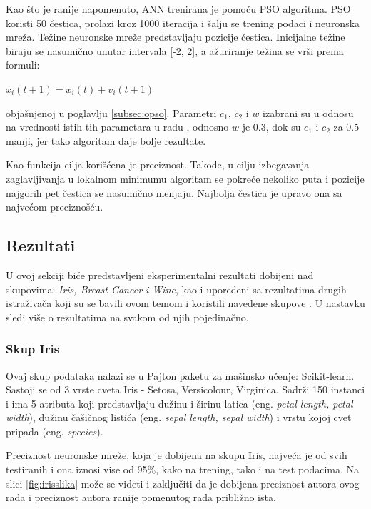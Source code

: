 \documentclass[a4paper]{article}
\begin{document}
{Kao što je ranije napomenuto, ANN trenirana je pomoću PSO algoritma. PSO koristi 50 čestica, prolazi kroz 1000 iteracija i šalju se trening podaci i neuronska mreža. Težine neuronske mreže predstavljaju pozicije čestica. Inicijalne težine biraju se nasumično unutar intervala [-2, 2], a ažuriranje težina se vrši prema formuli: 
\begin{center}
{$x_i(t+1) = x_i(t) + v_i(t+1)$}
\end{center}
objašnjenoj u poglavlju \ref{subsec:opso}. Parametri $c_1$, $c_2$ i $w$ izabrani su u odnosu na vrednosti istih tih parametara u radu \cite{hindawi},
odnosno $w$ je 0.3, dok su $c_1$ i $c_2$ za 0.5 manji, jer tako algoritam daje bolje rezultate. 

Kao funkcija cilja korišćena je preciznost. Takođe, u cilju izbegavanja zaglavljivanja u lokalnom minimumu algoritam se pokreće nekoliko puta i pozicije najgorih pet čestica se nasumično menjaju. Najbolja čestica je upravo ona sa najvećom preciznošću.

\subsection{Rezultati}
\label{rezultati}

U ovoj sekciji biće predstavljeni eksperimentalni rezultati dobijeni nad skupovima: \textit{Iris, Breast Cancer i Wine}, kao i upoređeni sa rezultatima drugih istraživača koji su se bavili ovom temom i koristili navedene skupove \cite{hindawi}. U nastavku sledi više o rezultatima na svakom od njih pojedinačno.

\subsubsection{Skup Iris}
\label{iris}

Ovaj skup podataka nalazi se u Pajton paketu za mašinsko učenje: Scikit-learn. Sastoji se od 3 vrste cveta Iris - Setosa, Versicolour, Virginica. 
Sadrži 150 instanci i ima 5 atributa koji predstavljaju dužinu i širinu latica (eng. \emph{petal length, petal width}), dužinu čašičnog listića 
(eng. \emph{sepal length, sepal width}) i vrstu kojoj cvet pripada (eng. \emph{species}). 

Preciznost neuronske mreže, koja je dobijena na skupu Iris, najveća je od svih testiranih i ona iznosi vise od 95\%, kako na trening, tako i na test podacima. Na slici \ref{fig:irisslika} može se videti i zaključiti da je dobijena preciznost autora ovog rada i preciznost autora ranije pomenutog rada \cite{hindawi} približno ista.

}
\end{document}
